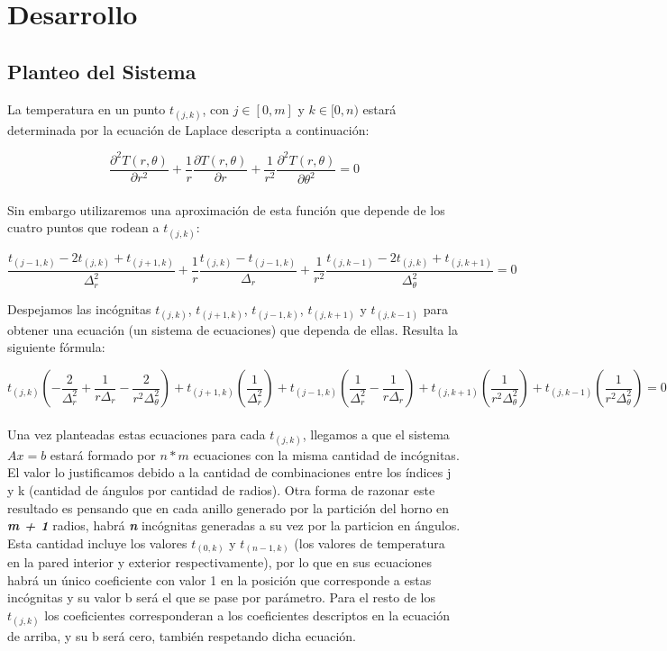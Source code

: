 \section{Desarrollo}

\subsection{Planteo del Sistema}


La temperatura en un punto $t_{(j,k)}$, con $j \in [0, m]$ y $k \in [0, n)$ estará determinada por la ecuación de Laplace descripta a continuación:


$$ \frac{\partial^{2}T(r,\theta)}{\partial r^{2}} + \frac{1}{r} \frac{\partial T(r,\theta)}{\partial r} + \frac{1}{r^{2}} \frac{\partial^{2}T(r,\theta)}{\partial \theta^{2}} = 0$$\\

Sin embargo utilizaremos una aproximación de esta función que depende de los cuatro puntos que rodean a $t_{(j,k)}$:


$$ \frac{t_{(j-1,k)} - 2t_{(j,k)} + t_{(j+1,k)}}{\Delta_{r} ^{2}} + \frac{1}{r} \frac{t_{(j,k)} - t_{(j-1,k)}}{\Delta_{r}} + \frac{1}{r^{2}} \frac{t_{(j,k-1)} - 2t_{(j,k)} + t_{(j,k+1)}}{\Delta_{\theta} ^{2}} = 0$$

Despejamos las incógnitas $t_{(j,k)}$, $t_{(j+1,k)}$, $t_{(j-1,k)}$, $t_{(j,k+1)}$ y $t_{(j,k-1)}$ para obtener una ecuación (un sistema de ecuaciones) que dependa de ellas. Resulta la siguiente fórmula:



$$  t_{(j,k)} (-\frac{2}{\Delta^2_r}+\frac{1}{r \Delta_r}-\frac{2}{r^2 \Delta^2_\theta}) + t_{(j+1,k)} (\frac{1}{\Delta^2_r}) + t_{(j-1,k)} (\frac{1}{\Delta^2_r}-\frac{1}{r \Delta_r}) + t_{(j,k+1)} (\frac{1}{r^2 \Delta^2_\theta}) + t_{(j,k-1)} (\frac{1}{r^2 \Delta^2_\theta}) = 0$$ \\


Una vez planteadas estas ecuaciones para cada $ t_{(j,k)} $, llegamos a que el sistema $Ax = b$ estará formado por $n*m$ ecuaciones con la misma cantidad de incógnitas. El valor lo justificamos debido a la cantidad de combinaciones entre los índices j y k (cantidad de ángulos por cantidad de radios). Otra forma de razonar este resultado es pensando que en cada anillo generado por la partición del horno en \textbf{\textit{m + 1}} radios, habrá \textbf{\textit{n}} incógnitas generadas a su vez por la particion en ángulos. \\
Esta cantidad incluye los valores $t_{(0,k)}$ y $t_{(n-1,k)}$ (los valores de temperatura en la pared interior y exterior respectivamente), por lo que en sus ecuaciones habrá un único coeficiente con valor 1 en la posición que corresponde a estas incógnitas y su valor b será el que se pase por parámetro. Para el resto de los $t_{(j,k)}$ los coeficientes corresponderan a los coeficientes descriptos en la ecuación de arriba, y su b será cero, también respetando dicha ecuación.


